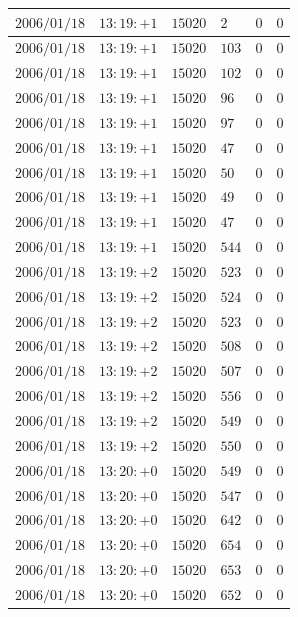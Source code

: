\documentclass[a4j,papersize,disablejfam,slide,14pt]{jsarticle}
\begin{document}
\begin{description}
\begin{center}
\begin{longtable}{|l|l|l|l|l|l|}
					$2006/01/18$ & $13:19:+1$  & $15020$ & $2$ & $0$ & $0$ \\ \hline
					$2006/01/18$ & $13:19:+1$  & $15020$ & $103$ & $0$ & $0$ \\ \hline
					$2006/01/18$ & $13:19:+1$  & $15020$ & $102$ & $0$ & $0$ \\ \hline
					$2006/01/18$ & $13:19:+1$  & $15020$ & $96$ & $0$ & $0$ \\ \hline
					$2006/01/18$ & $13:19:+1$  & $15020$ & $97$ & $0$ & $0$ \\ \hline
					$2006/01/18$ & $13:19:+1$  & $15020$ & $47$ & $0$ & $0$ \\ \hline
					$2006/01/18$ & $13:19:+1$  & $15020$ & $50$ & $0$ & $0$ \\ \hline
					$2006/01/18$ & $13:19:+1$  & $15020$ & $49$ & $0$ & $0$ \\ \hline
					$2006/01/18$ & $13:19:+1$  & $15020$ & $47$ & $0$ & $0$ \\ \hline
					$2006/01/18$ & $13:19:+1$  & $15020$ & $544$ & $0$ & $0$ \\ \hline
					$2006/01/18$ & $13:19:+2$  & $15020$ & $523$ & $0$ & $0$ \\ \hline
					$2006/01/18$ & $13:19:+2$  & $15020$ & $524$ & $0$ & $0$ \\ \hline
					$2006/01/18$ & $13:19:+2$  & $15020$ & $523$ & $0$ & $0$ \\ \hline
					$2006/01/18$ & $13:19:+2$  & $15020$ & $508$ & $0$ & $0$ \\ \hline
					$2006/01/18$ & $13:19:+2$  & $15020$ & $507$ & $0$ & $0$ \\ \hline
					$2006/01/18$ & $13:19:+2$  & $15020$ & $556$ & $0$ & $0$ \\ \hline
					$2006/01/18$ & $13:19:+2$  & $15020$ & $549$ & $0$ & $0$ \\ \hline
					$2006/01/18$ & $13:19:+2$  & $15020$ & $550$ & $0$ & $0$ \\ \hline
					$2006/01/18$ & $13:20:+0$  & $15020$ & $549$ & $0$ & $0$ \\ \hline
					$2006/01/18$ & $13:20:+0$  & $15020$ & $547$ & $0$ & $0$ \\ \hline
					$2006/01/18$ & $13:20:+0$  & $15020$ & $642$ & $0$ & $0$ \\ \hline
					$2006/01/18$ & $13:20:+0$  & $15020$ & $654$ & $0$ & $0$ \\ \hline
					$2006/01/18$ & $13:20:+0$  & $15020$ & $653$ & $0$ & $0$ \\ \hline
					$2006/01/18$ & $13:20:+0$  & $15020$ & $652$ & $0$ & $0$ \\ \hline

\end{longtable}
\end{center}
\end{description}
\end{document}
